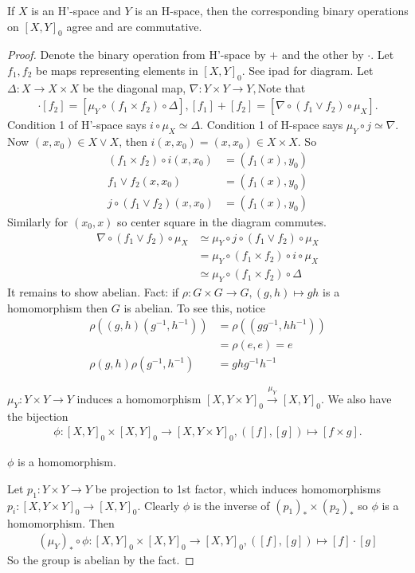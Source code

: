 \documentclass[12pt,class=article,crop=false]{standalone}
\begin{document}
\begin{thm}
	If $ X$ is an  H'-space and  $ Y$ is an H-space, then the corresponding binary operations on $ [X, Y]_0$ agree and are commutative.
\end{thm}
\begin{proof}
	Denote the binary operation from H'-space by $ +$ and the other by  $ \cdot $. Let $ f_1, f_2$ be maps representing elements in $ [X, Y]_0$. See ipad for diagram. Let $ \Delta: X \to X \times X$ be the diagonal map, $ \nabla : Y \times Y \to Y, $Note that
	\begin{align*}
		[f_1] \cdot  [f_2] = [\mu_Y \circ (f_1 \times f_2) \circ \Delta],
		[f_1]+[f_2] =[\nabla \circ (f_1 \vee f_2) \circ \mu_X].
	\end{align*}
Condition 1 of H'-space says $ i \circ \mu_X \simeq \Delta$. Condition 1 of H-space says $ \mu_Y \circ j \simeq \nabla $. Now $ (x,x_0) \in X \vee X$, then $ i(x,x_0) = (x,x_0) \in X \times X$. So
\begin{align*}
	(f_1 \times f_2) \circ  i(x,x_0) &= (f_1(x),y_0) \\
	f_1 \vee f_2(x,x_0) &= (f_1(x),y_0) \\
	j \circ  (f_1 \vee f_2) (x,x_0) &= (f_1(x),y_0) 
\end{align*}
Similarly for $ (x_0,x)$ so center square in the diagram commutes.
\begin{align*}
	\nabla \circ  (f_1 \vee f_2) \circ  \mu_X &\simeq \mu_Y \circ j \circ (f_1 \vee f_2) \circ  \mu_X \\
	&= \mu_Y \circ  (f_1 \times f_2) \circ i \circ \mu_X\\
	&\simeq \mu_Y \circ  (f_1 \times f_2) \circ  \Delta
\end{align*}
It remains to show abelian. Fact: if $ \rho : G \times G \to G, (g,h)\mapsto gh$ is a homomorphism then $ G$ is abelian. To see this, notice
 \begin{align*}
	 \rho((g,h) (g^{-1},h^{-1})) &= \rho((gg^{-1},h h^{-1}))\\
	&= \rho(e,e)= e \\
	 \rho(g,h) \rho(g^{-1},h^{-1}) &= gh g^{-1} h^{-1}
\end{align*}

$ \mu_Y: Y \times Y \to Y$ induces a homomorphism $ [X, Y\times Y]_0 \xrightarrow{ \mu_Y} [X, Y]_0$. We also have the bijection
\begin{align*}
	\phi: [X, Y]_0 \times [X, Y]_0 \to [X, Y\times Y]_0, ([f],[g])\mapsto [f \times g].
\end{align*}
\begin{claim}
$ \phi$ is a homomorphism.
\end{claim}
Let $ p_1: Y \times Y \to Y$ be projection to 1st factor, which induces homomorphisms $ p_i: [X, Y\times Y]_0 \to [X, Y]_0$. Clearly $ \phi$ is the inverse of $ (p_1)_* \times (p_2)_*$ so $ \phi$ is a homomorphism. Then
\begin{align*}
	(\mu_Y)_* \circ \phi: [X, Y]_0 \times [X, Y]_0 \to [X, Y]_0, ([f],[g]) \mapsto [f] \cdot [g]
\end{align*}
So the group is abelian by the fact.
\end{proof}
\end{document}
